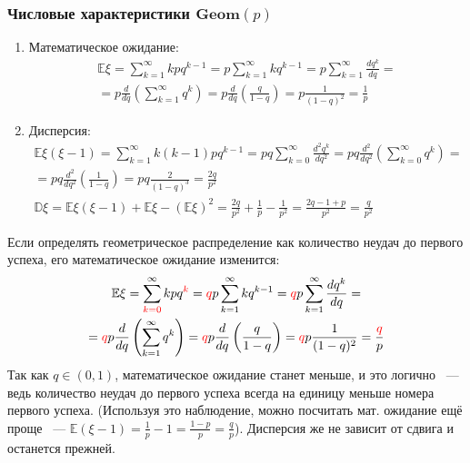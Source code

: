 \subsubsection{Числовые характеристики $\mathbf{Geom}(p)$}
\begin{enumerate}
    \item Математическое ожидание:
    \begin{multline*}
        \mathbb{E} \xi=\sum\limits_{k=1}^{\infty} k p q^{k-1}=p \sum\limits_{k=1}^{\infty} k q^{k-1}=p \sum\limits_{k=1}^{\infty} \frac{d q^{k}}{d q} = \\
        = p \frac{d}{d q}\left(\sum\limits_{k=1}^{\infty} q^{k}\right)=p \frac{d}{d q}\left(\frac{q}{1-q}\right)=p \frac{1}{(1-q)^{2}}=\frac{1}{p}
    \end{multline*}
    \item Дисперсия:
    \begin{multline*}
        \mathbb{E} \xi(\xi-1)=\sum\limits_{k=1}^{\infty} k(k-1) p q^{k-1}=p q \sum\limits_{k=0}^{\infty} \frac{d^{2} q^{k}}{d q^{2}} =p q \frac{d^{2}}{d q^{2}}\left(\sum\limits_{k=0}^{\infty} q^{k}\right) = \\
        =p q \frac{d^{2}}{d q^{2}}\left(\frac{1}{1-q}\right)=p q \frac{2}{(1-q)^{3}}=\frac{2 q}{p^{2}} \\
        \mathbb{D} \xi=\mathbb{E} \xi(\xi-1)+\mathbb{E} \xi-(\mathbb{E} \xi)^{2}=\frac{2 q}{p^{2}}+\frac{1}{p}-\frac{1}{p^{2}}=\frac{2 q-1+p}{p^{2}}=\frac{q}{p^{2}}
    \end{multline*}
\end{enumerate}

\begin{rmrk}
    Если определять геометрическое распределение как количество неудач до первого успеха, его математическое ожидание изменится:
    \begin{multline*}
        \mathbb{E} \xi=\sum\limits^{\infty}_{\color{red}k=0} k p q^{\color{red}k}= {\color{red}q}p \sum\limits_{k=1}^{\infty} k q^{k-1}= {\color{red}q}p \sum\limits_{k=1}^{\infty} \frac{d q^{k}}{d q} = \\
        = {\color{red}q}p \frac{d}{d q}\left(\sum\limits_{k=1}^{\infty} q^{k}\right)={\color{red}q} p \frac{d}{d q}\left(\frac{q}{1-q}\right)= {\color{red}q}p \frac{1}{(1-q)^{2}}=\frac{{\color{red}q}}{p}
    \end{multline*}
    Так как $q \in (0,1)$, математическое ожидание станет меньше, и это логично ~--- ведь количество неудач до первого успеха всегда на единицу меньше номера первого успеха. (Используя это наблюдение, можно посчитать мат. ожидание ещё проще ~--- $\mathbb{E}(\xi - 1) = \frac{1}{p} - 1 = \frac{1-p}{p} = \frac{q}{p}$). Дисперсия же не зависит от сдвига и останется прежней.
\end{rmrk}

